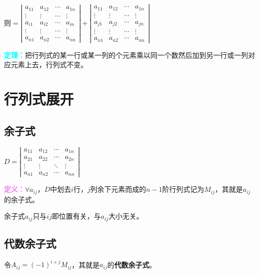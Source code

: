 \documentclass[UTF8, 12pt]{ctexart}
\begin{document}
则$=\left|\begin{array}{cccc}
a_{11} & a_{12} & \cdots & a_{1n} \\
\vdots & \vdots & \cdots & \vdots \\
a_{i1} & a_{i2} & \cdots & a_{in}\\
\vdots & \vdots & \cdots & \vdots \\
a_{n1} & a_{n2} & \cdots & a_{nn}
\end{array}\right|+
\left|\begin{array}{cccc}
a_{11} & a_{12} & \cdots & a_{1n} \\
\vdots & \vdots & \cdots & \vdots \\
a_{j1} & a_{j2} & \cdots & a_{jn} \\
\vdots & \vdots & \cdots & \vdots \\
a_{n1} & a_{n2} & \cdots & a_{nn}
\end{array}\right|$

\textcolor{aqua}{\textbf{定理：}}把行列式的某一行或某一列的个元素乘以同一个数然后加到另一行或一列对应元素上去，行列式不变。

\section{行列式展开}

\subsection{余子式}

$
D=\left|\begin{array}{cccc}
a_{11} & a_{12} & \cdots & a_{1n} \\
a_{21} & a_{22} & \cdots & a_{2n} \\
\vdots & \vdots & \ddots & \vdots \\
a_{n1} & a_{n2} & \cdots & a_{nn}
\end{array}\right|
$

\textcolor{violet}{\textbf{定义：}}$\forall a_{ij}$，$D$中划去$i$行，$j$列余下元素而成的$n-1$阶行列式记为$M_{ij}$，其就是$a_{ij}$的余子式。

余子式$a_{ij}$只与$ij$即位置有关，与$a_{ij}$大小无关。

\subsection{代数余子式}

令$A_{ij}=(-1)^{i+j}M_{ij}$，其就是$a_{ij}$的\textbf{代数余子式}。
\end{document}
